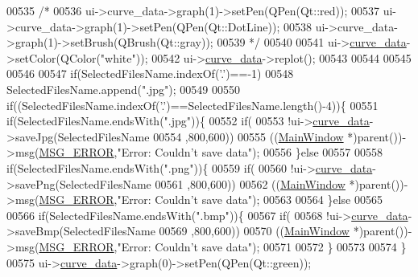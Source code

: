\begin{DoxyCode}
00535     \textcolor{comment}{/*}
00536 \textcolor{comment}{    ui->curve\_data->graph(1)->setPen(QPen(Qt::red));}
00537 \textcolor{comment}{    ui->curve\_data->graph(1)->setPen(QPen(Qt::DotLine));}
00538 \textcolor{comment}{    ui->curve\_data->graph(1)->setBrush(QBrush(Qt::gray));}
00539 \textcolor{comment}{    */}
00540 
00541     ui->\hyperlink{a00081_a247d94481323c0bc4f8b6458a8a535dd}{curve\_data}->setColor(QColor(\textcolor{stringliteral}{"white"}));
00542     ui->\hyperlink{a00081_a247d94481323c0bc4f8b6458a8a535dd}{curve\_data}->replot();
00543 
00544 
00545 
00546 
00547     \textcolor{keywordflow}{if}(SelectedFilesName.indexOf(\textcolor{charliteral}{'.'})==-1)
00548         SelectedFilesName.append(\textcolor{stringliteral}{".jpg"});
00549 
00550     \textcolor{keywordflow}{if}((SelectedFilesName.indexOf(\textcolor{charliteral}{'.'})==SelectedFilesName.length()-4))\{
00551     \textcolor{keywordflow}{if}(SelectedFilesName.endsWith(\textcolor{stringliteral}{".jpg"}))\{
00552        \textcolor{keywordflow}{if}(
00553         !ui->\hyperlink{a00081_a247d94481323c0bc4f8b6458a8a535dd}{curve\_data}->saveJpg(SelectedFilesName
00554                                 ,800,600))
00555             ((\hyperlink{a00017}{MainWindow} *)parent())->msg(\hyperlink{a00090_aa8a990825a5a62c89d2fb8b08d8a1070}{MSG\_ERROR},\textcolor{stringliteral}{"Error: Couldn't save data"});
00556     \}\textcolor{keywordflow}{else}
00557 
00558     \textcolor{keywordflow}{if}(SelectedFilesName.endsWith(\textcolor{stringliteral}{".png"}))\{
00559            \textcolor{keywordflow}{if}(
00560             !ui->\hyperlink{a00081_a247d94481323c0bc4f8b6458a8a535dd}{curve\_data}->savePng(SelectedFilesName
00561                                     ,800,600))
00562                 ((\hyperlink{a00017}{MainWindow} *)parent())->msg(\hyperlink{a00090_aa8a990825a5a62c89d2fb8b08d8a1070}{MSG\_ERROR},\textcolor{stringliteral}{"Error: Couldn't save data"});
00563 
00564     \}\textcolor{keywordflow}{else}
00565 
00566     \textcolor{keywordflow}{if}(SelectedFilesName.endsWith(\textcolor{stringliteral}{".bmp"}))\{
00567                   \textcolor{keywordflow}{if}(
00568                    !ui->\hyperlink{a00081_a247d94481323c0bc4f8b6458a8a535dd}{curve\_data}->saveBmp(SelectedFilesName
00569                                            ,800,600))
00570                        ((\hyperlink{a00017}{MainWindow} *)parent())->msg(\hyperlink{a00090_aa8a990825a5a62c89d2fb8b08d8a1070}{MSG\_ERROR},\textcolor{stringliteral}{"Error: Couldn't save
       data"});
00571 
00572      \}
00573 
00574     \}
00575      ui->\hyperlink{a00081_a247d94481323c0bc4f8b6458a8a535dd}{curve\_data}->graph(0)->setPen(QPen(Qt::green));

\end{DoxyCode}
